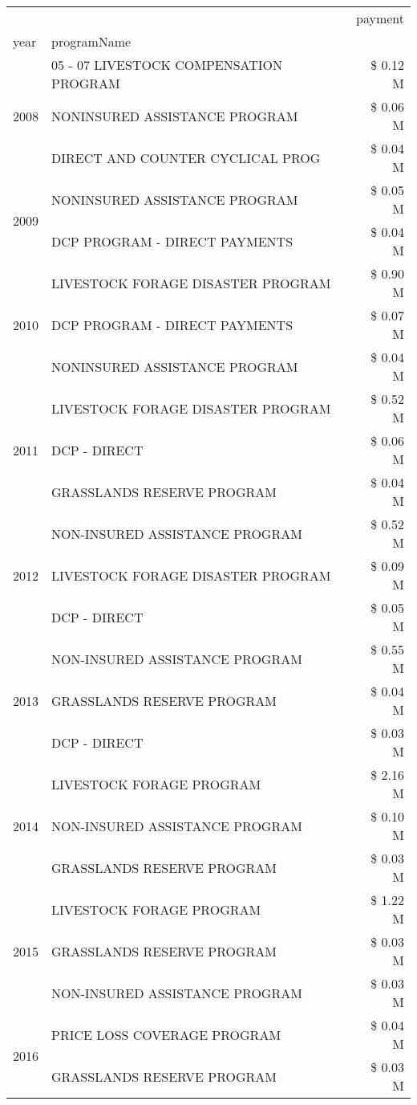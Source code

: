 \begin{tabular}{llr}
\toprule
 &  & payment \\
year & programName &  \\
\midrule
\multirow[t]{3}{*}{2008} & 05 - 07 LIVESTOCK COMPENSATION PROGRAM & \$ 0.12 M \\
 & NONINSURED ASSISTANCE PROGRAM & \$ 0.06 M \\
 & DIRECT AND COUNTER CYCLICAL PROG & \$ 0.04 M \\
\cline{1-3}
\multirow[t]{2}{*}{2009} & NONINSURED ASSISTANCE PROGRAM & \$ 0.05 M \\
 & DCP PROGRAM - DIRECT PAYMENTS & \$ 0.04 M \\
\cline{1-3}
\multirow[t]{3}{*}{2010} & LIVESTOCK FORAGE DISASTER  PROGRAM & \$ 0.90 M \\
 & DCP PROGRAM - DIRECT PAYMENTS & \$ 0.07 M \\
 & NONINSURED ASSISTANCE PROGRAM & \$ 0.04 M \\
\cline{1-3}
\multirow[t]{3}{*}{2011} & LIVESTOCK FORAGE DISASTER PROGRAM & \$ 0.52 M \\
 & DCP - DIRECT & \$ 0.06 M \\
 & GRASSLANDS RESERVE PROGRAM & \$ 0.04 M \\
\cline{1-3}
\multirow[t]{3}{*}{2012} & NON-INSURED ASSISTANCE PROGRAM & \$ 0.52 M \\
 & LIVESTOCK FORAGE DISASTER PROGRAM & \$ 0.09 M \\
 & DCP - DIRECT & \$ 0.05 M \\
\cline{1-3}
\multirow[t]{3}{*}{2013} & NON-INSURED ASSISTANCE PROGRAM & \$ 0.55 M \\
 & GRASSLANDS RESERVE PROGRAM & \$ 0.04 M \\
 & DCP - DIRECT & \$ 0.03 M \\
\cline{1-3}
\multirow[t]{3}{*}{2014} & LIVESTOCK FORAGE PROGRAM & \$ 2.16 M \\
 & NON-INSURED ASSISTANCE PROGRAM & \$ 0.10 M \\
 & GRASSLANDS RESERVE PROGRAM & \$ 0.03 M \\
\cline{1-3}
\multirow[t]{3}{*}{2015} & LIVESTOCK FORAGE PROGRAM & \$ 1.22 M \\
 & GRASSLANDS RESERVE PROGRAM & \$ 0.03 M \\
 & NON-INSURED ASSISTANCE PROGRAM & \$ 0.03 M \\
\cline{1-3}
\multirow[t]{3}{*}{2016} & PRICE LOSS COVERAGE PROGRAM & \$ 0.04 M \\
 & GRASSLANDS RESERVE PROGRAM & \$ 0.03 M \\

\end{tabular}
